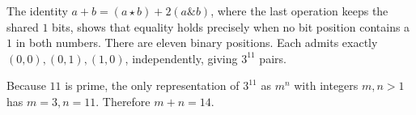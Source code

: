 The identity $a+b=(a\star b)+2(a\mathbin{\&}b)$, where the last operation keeps the shared $1$ bits, shows that equality holds precisely when no bit position contains a $1$ in both numbers. There are eleven binary positions. Each admits exactly $(0,0),(0,1),(1,0)$, independently, giving $3^{11}$ pairs.

Because $11$ is prime, the only representation of $3^{11}$ as $m^n$ with integers $m,n>1$ has $m=3,n=11$. Therefore $\boxed{m+n=14}$.
